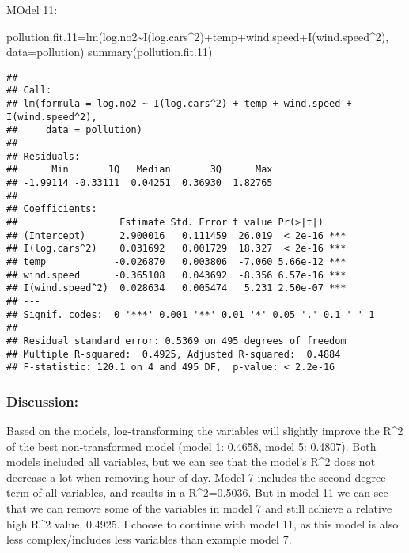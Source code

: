 \documentclass[
]{article}
\newenvironment{Shaded}{\begin{snugshade}}{\end{snugshade}}
\newcommand{\AttributeTok}[1]{\textcolor[rgb]{0.77,0.63,0.00}{#1}}
\newcommand{\DecValTok}[1]{\textcolor[rgb]{0.00,0.00,0.81}{#1}}
\newcommand{\FloatTok}[1]{\textcolor[rgb]{0.00,0.00,0.81}{#1}}
\newcommand{\FunctionTok}[1]{\textcolor[rgb]{0.00,0.00,0.00}{#1}}
\newcommand{\NormalTok}[1]{#1}
\newcommand{\OtherTok}[1]{\textcolor[rgb]{0.56,0.35,0.01}{#1}}
\newcommand{\SpecialCharTok}[1]{\textcolor[rgb]{0.00,0.00,0.00}{#1}}
\begin{document}
MOdel 11:

\begin{Shaded}
\begin{Highlighting}[]
\NormalTok{pollution.fit}\FloatTok{.11}\OtherTok{=}\FunctionTok{lm}\NormalTok{(log.no2}\SpecialCharTok{\textasciitilde{}}\FunctionTok{I}\NormalTok{(log.cars}\SpecialCharTok{\^{}}\DecValTok{2}\NormalTok{)}\SpecialCharTok{+}\NormalTok{temp}\SpecialCharTok{+}\NormalTok{wind.speed}\SpecialCharTok{+}\FunctionTok{I}\NormalTok{(wind.speed}\SpecialCharTok{\^{}}\DecValTok{2}\NormalTok{), }\AttributeTok{data=}\NormalTok{pollution)}
\FunctionTok{summary}\NormalTok{(pollution.fit}\FloatTok{.11}\NormalTok{)}
\end{Highlighting}
\end{Shaded}

\begin{verbatim}
## 
## Call:
## lm(formula = log.no2 ~ I(log.cars^2) + temp + wind.speed + I(wind.speed^2), 
##     data = pollution)
## 
## Residuals:
##      Min       1Q   Median       3Q      Max 
## -1.99114 -0.33111  0.04251  0.36930  1.82765 
## 
## Coefficients:
##                  Estimate Std. Error t value Pr(>|t|)    
## (Intercept)      2.900016   0.111459  26.019  < 2e-16 ***
## I(log.cars^2)    0.031692   0.001729  18.327  < 2e-16 ***
## temp            -0.026870   0.003806  -7.060 5.66e-12 ***
## wind.speed      -0.365108   0.043692  -8.356 6.57e-16 ***
## I(wind.speed^2)  0.028634   0.005474   5.231 2.50e-07 ***
## ---
## Signif. codes:  0 '***' 0.001 '**' 0.01 '*' 0.05 '.' 0.1 ' ' 1
## 
## Residual standard error: 0.5369 on 495 degrees of freedom
## Multiple R-squared:  0.4925, Adjusted R-squared:  0.4884 
## F-statistic: 120.1 on 4 and 495 DF,  p-value: < 2.2e-16
\end{verbatim}

\hypertarget{discussion-1}{%
\subsubsection{Discussion:}\label{discussion-1}}

Based on the models, log-transforming the variables will slightly
improve the R\^{}2 of the best non-transformed model (model 1: 0.4658,
model 5: 0.4807). Both models included all variables, but we can see
that the model's R\^{}2 does not decrease a lot when removing hour of
day. Model 7 includes the second degree term of all variables, and
results in a R\^{}2=0.5036. But in model 11 we can see that we can
remove some of the variables in model 7 and still achieve a relative
high R\^{}2 value, 0.4925. I choose to continue with model 11, as this
model is also less complex/includes less variables than example model 7.
\end{document}

